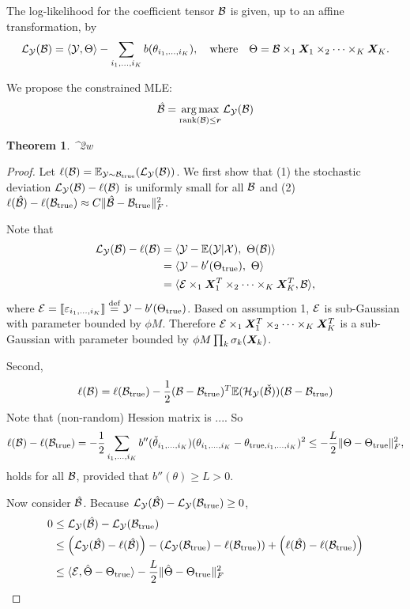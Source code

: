 \documentclass[11pt]{article}
\theoremstyle{plain}
\newtheorem{thm}{Theorem}
\theoremstyle{definition}
\begin{document}
The log-likelihood for the coefficient tensor $\mathcal{B}$ is given, up to an affine transformation, by
\[
\mathcal{L}_{\mathcal{Y}}(\mathcal{B})=\langle \mathcal{Y}, \Theta \rangle - \sum_{i_1,\ldots,i_K}b(\theta_{i_1,\ldots,i_K}),\quad \text{where}\quad \Theta=\mathcal{B}\times_1\bm X_1\times_2\cdots\times_K \bm X_K.
\]

We propose the constrained MLE:
\[
\hat {\mathcal{B}}=\operatorname*{arg\,max}_{\text{rank}(\mathcal{B})\leq \bm{r}} \mathcal{L}_{\mathcal{Y}}(\mathcal{B})
\]

\begin{thm}
\FnormSize{}{\hat \tB-\tB}^2\leq w
\end{thm}

\begin{proof}
Let $\ell(\mathcal{B})=\mathbb{E}_{\mathcal{Y}\sim \mathcal{\mathcal{B}}_{\text{true}}}(\mathcal{L}_{\mathcal{Y}}(\mathcal{B}))$. We first show that (1) the stochastic deviation $\mathcal{L}_{\mathcal{Y}}(\mathcal{B})-\ell(\mathcal{B})$ is uniformly small for all $\mathcal{B}$ and (2) $\ell(\hat {\mathcal{B}}) - \ell(\mathcal{\mathcal{B}}_{\text{true}}) \approx C\lVert\hat {\mathcal{B}}-\mathcal{\mathcal{B}}_{\text{true}}\rVert_F^2$.


Note that 
\begin{align}
\mathcal{L}_{\mathcal{Y}}(\mathcal{B})-\ell(\mathcal{B})&=\langle \mathcal{Y}-\mathbb{E}(\mathcal{Y}|\mathcal{X}),\ \Theta(\mathcal{B})\rangle\\
&= \langle \mathcal{Y}- b'(\Theta_{\text{true}}),\ \Theta\rangle \\
&= \langle \mathcal{E}\times_1\bm X^T_1\times_2\cdots\times_K\bm X^T_K, \mathcal{B}\rangle,
\end{align}
where $\mathcal{E}=\llbracket \varepsilon_{i_1,\ldots,i_K} \rrbracket\stackrel{\text{def}}{=}\mathcal{Y}-b'(\Theta_{\text{true}})$. Based on assumption 1, $\mathcal{E}$ is sub-Gaussian with parameter bounded by $\phi M$. Therefore $\mathcal{E}\times_1\bm X^T_1\times_2\cdots\times_K\bm X^T_K$ is a sub-Gaussian with parameter bounded by $\phi M \prod_k \sigma_k(\bm X_k)$.

Second, 
\[
\ell(\mathcal{B})=\ell(\mathcal{\mathcal{B}}_{\text{true}})-{1\over 2}(\mathcal{B}-\mathcal{\mathcal{B}}_{\text{true}})^T\mathbb{E}(\mathcal{H}_{\mathcal{Y}}(\check {\mathcal{B}}))(\mathcal{B}-\mathcal{\mathcal{B}}_{\text{true}})
\]
Note that (non-random) Hession matrix is .... So
\[
\ell(\mathcal{B})-\ell(\mathcal{\mathcal{B}}_{\text{true}})=-{1\over 2}\sum_{i_1,\ldots,i_K}b''(\check \theta_{i_1,\ldots,i_K}) (\theta_{i_1,\ldots,i_K}-\theta_{\text{true},i_1,\ldots,i_K})^2 \leq -{L \over 2}\lVert\Theta-\Theta_{\text{true}}\rVert_F^2,
\]
holds for all $\mathcal{B}$, provided that $b''(\theta)\geq L>0$.

Now consider $\hat {\mathcal{B}}$. Because $\mathcal{L}_{\mathcal{Y}}(\hat {\mathcal{B}})- \mathcal{L}_{\mathcal{Y}}(\mathcal{\mathcal{B}}_{\text{true}})\geq 0$, 
\begin{align}
0&\leq \mathcal{L}_{\mathcal{Y}}(\hat {\mathcal{B}})- \mathcal{L}_{\mathcal{Y}}(\mathcal{\mathcal{B}}_{\text{true}}) \\
&\leq \left(\mathcal{L}_{\mathcal{Y}}(\hat {\mathcal{B}})-\ell(\hat {\mathcal{B}})\right)-\left( \mathcal{L}_{\mathcal{Y}}(\mathcal{\mathcal{B}}_{\text{true}})-\ell(\mathcal{\mathcal{B}}_{\text{true}})\right)+\left(\ell(\hat {\mathcal{B}})-\ell(\mathcal{\mathcal{B}}_{\text{true}})\right)\\
&\leq \langle \mathcal{E}, \hat \Theta-\Theta_{\text{true}} \rangle -{L\over 2}\lVert\hat \Theta-\Theta_{\text{true}}\rVert_F^2
\end{align}


\end{proof}
\end{document}
